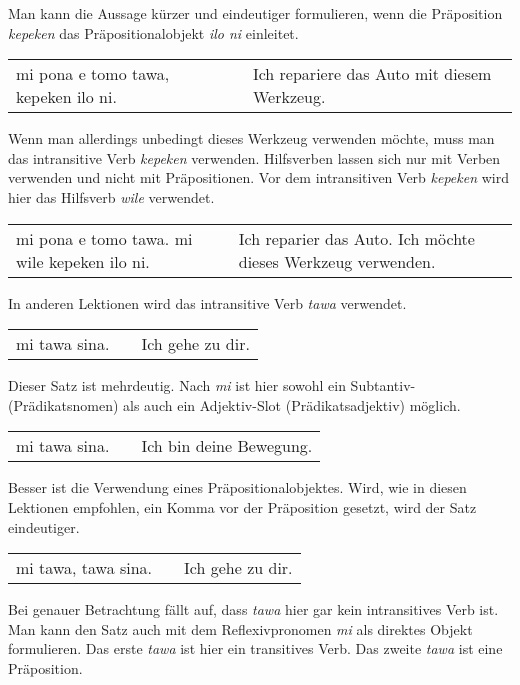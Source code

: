 Man kann die Aussage kürzer und eindeutiger formulieren, wenn die Präposition \textit{kepeken} das Präpositionalobjekt \textit{ilo ni} einleitet. 

\begin{supertabular}{p{5,5cm}|ll}
mi pona e tomo tawa, kepeken ilo ni. &&  Ich repariere das Auto mit diesem Werkzeug. \\
\end{supertabular} 

Wenn man allerdings unbedingt dieses Werkzeug verwenden möchte, muss man das intransitive Verb \textit{kepeken} verwenden. 
Hilfsverben lassen sich nur mit Verben verwenden und nicht mit Präpositionen. 
Vor dem intransitiven Verb \textit{kepeken} wird hier das Hilfsverb \textit{wile} verwendet. 

\begin{supertabular}{p{5,5cm}|ll}
mi pona e tomo tawa. mi wile kepeken ilo ni. && Ich reparier das Auto. Ich möchte dieses Werkzeug verwenden. \\
\end{supertabular} 

%
%
In anderen Lektionen wird das intransitive Verb \textit{tawa} verwendet.

\begin{supertabular}{p{5,5cm}|ll}
mi tawa sina. && Ich gehe zu dir. \\ %
\end{supertabular} 

Dieser Satz ist mehrdeutig. 
Nach \textit{mi} ist hier sowohl ein Subtantiv- (Prädikatsnomen) als auch ein Adjektiv-Slot (Prädikatsadjektiv) möglich. 

\begin{supertabular}{p{5,5cm}|ll}
mi tawa sina. &&  Ich bin deine Bewegung. \\ %
\end{supertabular} 

Besser ist die Verwendung eines Präpositionalobjektes.
Wird, wie in diesen Lektionen empfohlen, ein Komma vor der Präposition gesetzt, wird der Satz eindeutiger.

\begin{supertabular}{p{5,5cm}|ll}
mi tawa, tawa sina. && Ich gehe zu dir. \\ 
\end{supertabular} 

Bei genauer Betrachtung fällt auf, dass \textit{tawa} hier gar kein intransitives Verb ist.
Man kann den Satz auch mit dem Reflexivpronomen \textit{mi} als direktes Objekt formulieren. 
Das erste \textit{tawa} ist hier ein transitives Verb. 
Das zweite \textit{tawa} ist eine Präposition. 

